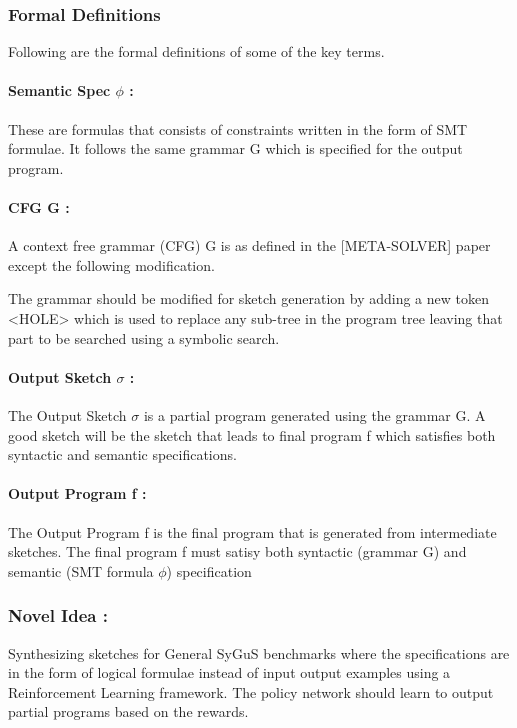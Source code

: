 \subsubsection{Formal Definitions}

Following are the formal definitions of some of the key terms.

\paragraph{Semantic Spec $\phi$ :}
These are formulas that consists of constraints written in the form of SMT formulae. It follows the same grammar G which is specified for the output program.

\paragraph{CFG G :}
A context free grammar (CFG) G is as defined in the [META-SOLVER] paper except the following modification.

The grammar should be modified for sketch generation by adding a new token <HOLE> which is used to replace any sub-tree in the program tree leaving that part to be searched using a symbolic search.

\paragraph{Output Sketch $\sigma$ :}
The Output Sketch $\sigma$ is a partial program generated using the grammar G. A good sketch will be the sketch that leads to final program f which satisfies both syntactic and semantic specifications.

\paragraph{Output Program f :}
The Output Program f is the final program that is generated from intermediate sketches. The final program f must satisy both syntactic (grammar G) and semantic (SMT formula $\phi$) specification 

\subsubsection{Novel Idea :}
Synthesizing sketches for General SyGuS benchmarks where the specifications are in the form of logical formulae instead of input output examples using a Reinforcement Learning framework. The policy network should learn to output partial programs based on the rewards.

